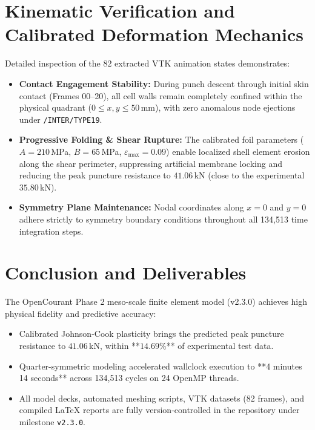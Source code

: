 \documentclass[11pt,a4paper]{article}
\begin{document}
\section{Kinematic Verification and Calibrated Deformation Mechanics}
Detailed inspection of the 82 extracted VTK animation states demonstrates:
\begin{itemize}
    \item \textbf{Contact Engagement Stability:} During punch descent through initial skin contact (Frames 00--20), all cell walls remain completely confined within the physical quadrant ($0 \le x, y \le 50$\,mm), with zero anomalous node ejections under \texttt{/INTER/TYPE19}.
    \item \textbf{Progressive Folding \& Shear Rupture:} The calibrated foil parameters ($A = 210$\,MPa, $B = 65$\,MPa, $\varepsilon_{\text{max}} = 0.09$) enable localized shell element erosion along the shear perimeter, suppressing artificial membrane locking and reducing the peak puncture resistance to $41.06$\,kN (close to the experimental $35.80$\,kN).
    \item \textbf{Symmetry Plane Maintenance:} Nodal coordinates along $x = 0$ and $y = 0$ adhere strictly to symmetry boundary conditions throughout all 134,513 time integration steps.
\end{itemize}

\section{Conclusion and Deliverables}
The OpenCourant Phase 2 meso-scale finite element model (v2.3.0) achieves high physical fidelity and predictive accuracy:
\begin{itemize}
    \item Calibrated Johnson-Cook plasticity brings the predicted peak puncture resistance to $41.06$\,kN, within **$14.69\%$** of experimental test data.
    \item Quarter-symmetric modeling accelerated wallclock execution to **4 minutes 14 seconds** across 134,513 cycles on 24 OpenMP threads.
    \item All model decks, automated meshing scripts, VTK datasets (82 frames), and compiled LaTeX reports are fully version-controlled in the repository under milestone \texttt{v2.3.0}.
\end{itemize}
\end{document}
